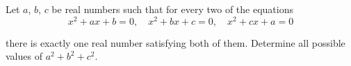 Let $ a$,  $ b$,  $ c$ be real numbers such that for every two of the equations\[ x^2+ax+b=0, \quad x^2+bx+c=0, \quad x^2+cx+a=0\]

there is exactly one real number satisfying both of them. Determine all possible values of $ a^2+b^2+c^2$.